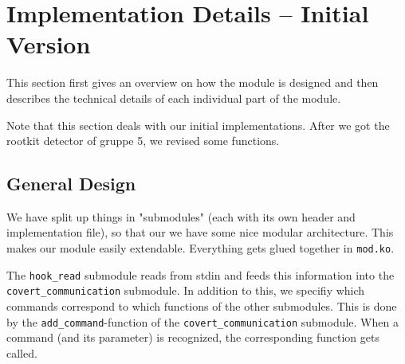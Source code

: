 \documentclass[10pt, letterpaper]{scrartcl}
\begin{document}
\section{Implementation Details -- Initial Version}
\label{sec:implementation}

This section first gives an overview on how the module is designed and then describes the technical details of each individual part of the module. 

Note that this section deals with our initial implementations. After we got the rootkit detector of gruppe 5, we revised some functions.

\subsection{General Design}
\label{sec:general_design}
We have split up things in "submodules" (each with its own header and implementation file), so
that our we have some nice modular architecture. This makes our module easily extendable. Everything gets glued together in \texttt{mod.ko}.

The \texttt{hook\_read} submodule reads from stdin and feeds this information into the \linebreak \texttt{covert\_communication} submodule. In addition to this, we specifiy which commands correspond to which functions of the other submodules. This is done by the \texttt{add\_command}-function of the  \texttt{covert\_communication} submodule. When a command (and its parameter) is recognized, the corresponding function gets called.
\end{document}
